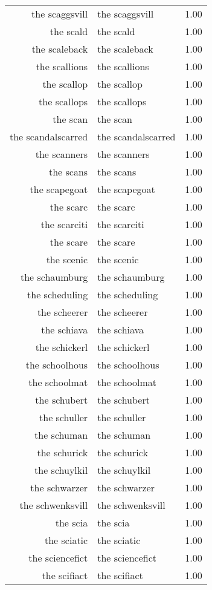 \begin{table}[ht]
\begin{tabular}{rlr}
  the scaggsvill & the scaggsvill & 1.00 \\ 
  the scald & the scald & 1.00 \\ 
  the scaleback & the scaleback & 1.00 \\ 
  the scallions & the scallions & 1.00 \\ 
  the scallop & the scallop & 1.00 \\ 
  the scallops & the scallops & 1.00 \\ 
  the scan & the scan & 1.00 \\ 
  the scandalscarred & the scandalscarred & 1.00 \\ 
  the scanners & the scanners & 1.00 \\ 
  the scans & the scans & 1.00 \\ 
  the scapegoat & the scapegoat & 1.00 \\ 
  the scarc & the scarc & 1.00 \\ 
  the scarciti & the scarciti & 1.00 \\ 
  the scare & the scare & 1.00 \\ 
  the scenic & the scenic & 1.00 \\ 
  the schaumburg & the schaumburg & 1.00 \\ 
  the scheduling & the scheduling & 1.00 \\ 
  the scheerer & the scheerer & 1.00 \\ 
  the schiava & the schiava & 1.00 \\ 
  the schickerl & the schickerl & 1.00 \\ 
  the schoolhous & the schoolhous & 1.00 \\ 
  the schoolmat & the schoolmat & 1.00 \\ 
  the schubert & the schubert & 1.00 \\ 
  the schuller & the schuller & 1.00 \\ 
  the schuman & the schuman & 1.00 \\ 
  the schurick & the schurick & 1.00 \\ 
  the schuylkil & the schuylkil & 1.00 \\ 
  the schwarzer & the schwarzer & 1.00 \\ 
  the schwenksvill & the schwenksvill & 1.00 \\ 
  the scia & the scia & 1.00 \\ 
  the sciatic & the sciatic & 1.00 \\ 
  the sciencefict & the sciencefict & 1.00 \\ 
  the scifiact & the scifiact & 1.00 \\ 

\end{tabular}
\end{table}
